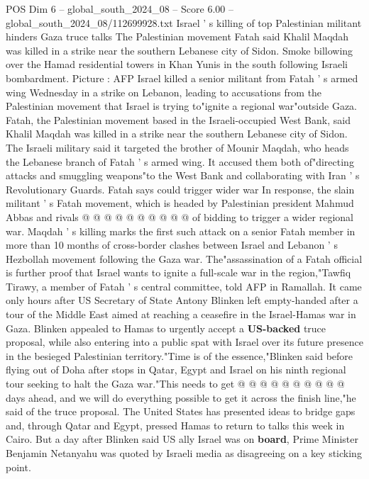 \begin{textsample}{POS Dim 6 – global\_south\_2024\_08 – Score 6.00 – global\_south\_2024\_08/112699928.txt}  \label{ex:f6_pos_327}
Israel ' s killing of top Palestinian militant hinders Gaza truce talks The Palestinian movement Fatah said Khalil Maqdah was killed in a strike near the southern Lebanese city of Sidon.
Smoke billowing over the Hamad residential towers in Khan Yunis in the south following Israeli bombardment.
Picture : AFP Israel killed a senior militant from Fatah ' s armed wing Wednesday in a strike on Lebanon, leading to accusations from the Palestinian movement that Israel is trying to"ignite a regional war"outside Gaza.
Fatah, the Palestinian movement based in the Israeli-occupied West Bank, said Khalil Maqdah was killed in a strike near the southern Lebanese city of Sidon.
The Israeli military said it targeted the brother of Mounir Maqdah, who heads the Lebanese branch of Fatah ' s armed wing.
It accused them both of"directing attacks and smuggling weapons"to the West Bank and collaborating with Iran ' s Revolutionary Guards.
Fatah says could trigger wider war In response, the slain militant ' s Fatah movement, which is headed by Palestinian president Mahmud Abbas and rivals @ @ @ @ @ @ @ @ @ @ of bidding to trigger a wider regional war.
Maqdah ' s killing marks the first such attack on a senior Fatah member in more than 10 months of cross-border clashes between Israel and Lebanon ' s Hezbollah movement following the Gaza war.
The"assassination of a Fatah official is further proof that Israel wants to ignite a full-scale war in the region,"Tawfiq Tirawy, a member of Fatah ' s central committee, told AFP in Ramallah.
It came only hours after US Secretary of State Antony Blinken left empty-handed after a tour of the Middle East aimed at reaching a ceasefire in the Israel-Hamas war in Gaza.
Blinken appealed to Hamas to urgently accept a \textbf{US-backed} truce proposal, while also entering into a public spat with Israel over its future presence in the besieged Palestinian territory."Time is of the essence,"Blinken said before flying out of Doha after stops in Qatar, Egypt and Israel on his ninth regional tour seeking to halt the Gaza war."This needs to get @ @ @ @ @ @ @ @ @ @ days ahead, and we will do everything possible to get it across the finish line,"he said of the truce proposal.
The United States has presented ideas to bridge gaps and, through Qatar and Egypt, pressed Hamas to return to talks this week in Cairo.
But a day after Blinken said US ally Israel was on \textbf{board}, Prime Minister Benjamin Netanyahu was quoted by Israeli media as disagreeing on a key sticking point.

\end{textsample}
